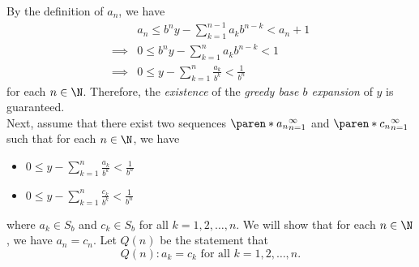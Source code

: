     By the definition of $a_{n}$, we have
    \begin{align*}
        &a_{n} \leq b^{n}y - \sum_{k = 1}^{n - 1} a_{k}b^{n - k} < a_{n} + 1 \\
        \implies &0 \leq b^{n}y - \sum_{k = 1}^{n} a_{k}b^{n - k} < 1 \\
        \implies &0 \leq y - \sum_{k = 1}^{n} \frac{a_{k}}{b^{k}} < \frac{1}{b^{n}}
    \end{align*}
    for each $n \in \N$. Therefore, the \emph{existence} of the \emph{greedy base $b$ expansion} of $y$ is guaranteed.
    \\[6mm]
    Next, assume that there exist two sequences $\paren*{a_{n}}_{n = 1}^{\infty}$
    and $\paren*{c_{n}}_{n = 1}^{\infty}$ such that for each $n \in \N$, we have

    \begin{itemize}
        \item $\displaystyle 0 \leq y - \sum_{k = 1}^{n} \frac{a_{k}}{b^{k}} < \frac{1}{b^{n}}$
        \item $\displaystyle 0 \leq y - \sum_{k = 1}^{n} \frac{c_{k}}{b^{k}} < \frac{1}{b^{n}}$
    \end{itemize}
    where $a_{k} \in S_{b}$ and $c_{k} \in S_{b}$ for all $k = 1, 2, \dots, n$. We will show that
    for each $n \in \N$, we have $a_{n} = c_{n}$. Let $Q(n)$ be the statement that
    \[
    Q(n) : a_{k} = c_{k} \text{ for all } k = 1, 2, \dots, n.
    \]
